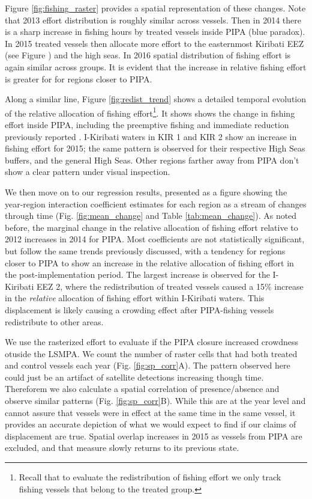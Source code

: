 \documentclass[11pt,]{article}
\let\rmarkdownfootnote\footnote%
\def\footnote{\protect\rmarkdownfootnote}
\begin{document}
Figure \ref{fig:fishing_raster} provides a spatial representation of
these changes. Note that 2013 effort distribution is roughly similar
across vessels. Then in 2014 there is a sharp increase in fishing hours
by treated vessels inside PIPA (blue paradox). In 2015 treated vessels
then allocate more effort to the easternmost Kiribati EEZ (see Figure
\label{fig:PNA_map}) and the high seas. In 2016 spatial distribution of
fishing effort is again similar across groups. It is evident that the
increase in relative fishing effort is greater for for regions closer to
PIPA.

Along a similar line, Figure \ref{fig:redist_trend} shows a detailed
temporal evolution of the relative allocation of fishing
effort\footnote{Recall that to evaluate the redistribution of fishing effort we only track fishing vessels that belong to the treated group.}.
It shows shows the change in fishing effort inside PIPA, including the
preemptive fishing and immediate reduction previously reported
\citep{mcdermott_2018}. I-Kiribati waters in KIR 1 and KIR 2 show an
increase in fishing effort for 2015; the same pattern is observed for
their respective High Seas buffers, and the general High Seas. Other
regions farther away from PIPA don't show a clear pattern under visual
inspection.

We then move on to our regression results, presented as a figure showing
the year-region interaction coefficient estimates for each region as a
stream of changes through time (Fig. \ref{fig:mean_change} and Table
\ref{tab:mean_change}). As noted before, the marginal change in the
relative allocation of fishing effort relative to 2012 increases in 2014
for PIPA. Most coefficients are not statistically significant, but
follow the same trends previously discussed, with a tendency for regions
closer to PIPA to show an increase in the relative allocation of fishing
effort in the post-implementation period. The largest increase is
observed for the I-Kiribati EEZ 2, where the redistribution of treated
vessels caused a 15\% increase in the \emph{relative} allocation of
fishing effort within I-Kiribati waters. This displacement is likely
causing a crowding effect after PIPA-fishing vessels redistribute to
other areas.

We use the rasterized effort to evaluate if the PIPA closure increased
crowdness otuside the LSMPA. We count the number of raster cells that
had both treated and control vessels each year (Fig.
\ref{fig:sp_corr}A). The pattern observed here could just be an artifact
of satellite detections increasing though time. Thereforem we also
calculate a spatial correlation of presence/absence and observe similar
patterns (Fig. \ref{fig:sp_corr}B). While this are at the year level and
cannot assure that vessels were in effect at the same time in the same
vessel, it provides an accurate depiction of what we would expect to
find if our claims of displacement are true. Spatial overlap increases
in 2015 as vessels from PIPA are excluded, and that measure slowly
returns to its previous state.
\end{document}
